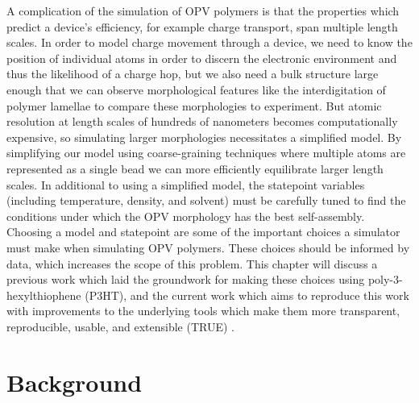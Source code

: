 A complication of the simulation of OPV polymers is that the properties which predict a device's efficiency, for example charge transport, span multiple length scales.
In order to model charge movement through a device, we need to know the position of individual atoms in order to discern the electronic environment and thus the likelihood of a charge hop, but we also need a bulk structure large enough that we can observe morphological features like the interdigitation of polymer lamellae to compare these morphologies to experiment.
But atomic resolution at length scales of hundreds of nanometers becomes computationally expensive, so simulating larger morphologies necessitates a simplified model.
By simplifying our model using coarse-graining techniques where multiple atoms are represented as a single bead we can more efficiently equilibrate larger length scales.
In additional to using a simplified model, the statepoint variables (including temperature, density, and solvent) must be carefully tuned to find the conditions under which the OPV morphology has the best self-assembly. 
Choosing a model and statepoint are some of the important choices a simulator must make when simulating OPV polymers. 
These choices should be informed by data, which increases the scope of this problem.
This chapter will discuss a previous work which laid the groundwork for making these choices using poly-3-hexylthiophene (P3HT), and the current work which aims to reproduce this work with improvements to the underlying tools which make them more transparent, reproducible, usable, and extensible (TRUE) \citep{Thompson2020}.

\section{Background} 

